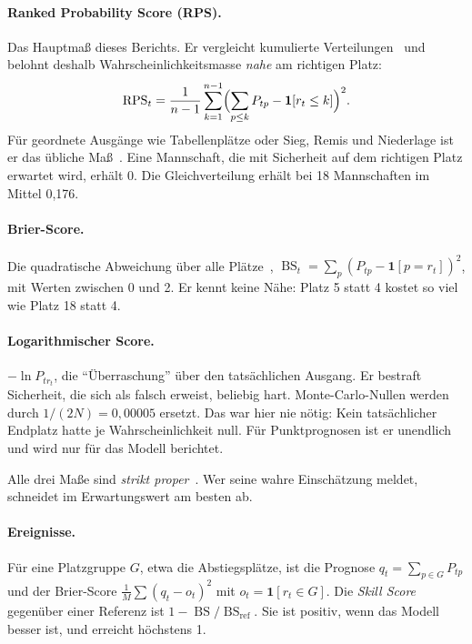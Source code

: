 \documentclass[11pt,a4paper,parskip=half,numbers=noenddot]{scrartcl}
\newcommand{\RPS}{\operatorname{RPS}}
\newcommand{\BS}{\operatorname{BS}}
\begin{document}
\paragraph{Ranked Probability Score (RPS).} Das Hauptmaß dieses Berichts.
Er vergleicht kumulierte Verteilungen~\cite{epstein1969} und
belohnt deshalb Wahrscheinlichkeitsmasse \emph{nahe} am richtigen Platz:
\begin{equation}
  \RPS_t = \frac{1}{n-1} \sum_{k=1}^{n-1}
           \Bigl(\sum_{p \le k} P_{tp} - \mathbf{1}[r_t \le k]\Bigr)^2 .
\end{equation}
Für geordnete Ausgänge wie Tabellenplätze oder Sieg, Remis und Niederlage
ist er das übliche Maß~\cite{constantinou2012}. Eine Mannschaft, die mit
Sicherheit auf dem richtigen Platz erwartet wird, erhält 0. Die
Gleichverteilung erhält bei 18 Mannschaften im Mittel 0,176.

\paragraph{Brier-Score.} Die quadratische Abweichung über alle
Plätze~\cite{brier1950}, $\BS_t = \sum_p (P_{tp} - \mathbf{1}[p = r_t])^2$,
mit Werten zwischen 0 und 2. Er kennt keine Nähe: Platz 5 statt 4 kostet so
viel wie Platz 18 statt 4.

\paragraph{Logarithmischer Score.} $-\ln P_{t r_t}$, die
\enquote{Überraschung} über den tatsächlichen Ausgang. Er bestraft
Sicherheit, die sich als falsch erweist, beliebig hart. Monte-Carlo-Nullen
werden durch $1/(2N) = 0{,}00005$ ersetzt. Das war hier nie nötig: Kein
tatsächlicher Endplatz hatte je Wahrscheinlichkeit null. Für Punktprognosen
ist er unendlich und wird nur für das Modell berichtet.

Alle drei Maße sind \emph{strikt proper}~\cite{gneiting2007}. Wer seine
wahre Einschätzung meldet, schneidet im Erwartungswert am besten ab.

\paragraph{Ereignisse.} Für eine Platzgruppe $G$, etwa die Abstiegsplätze,
ist die Prognose $q_t = \sum_{p \in G} P_{tp}$ und der Brier-Score
$\frac1M\sum (q_t - o_t)^2$ mit $o_t = \mathbf 1[r_t \in G]$. Die
\emph{Skill Score} gegenüber einer Referenz ist $1 - \BS/\BS_{\text{ref}}$.
Sie ist positiv, wenn das Modell besser ist, und erreicht höchstens 1.
\end{document}
